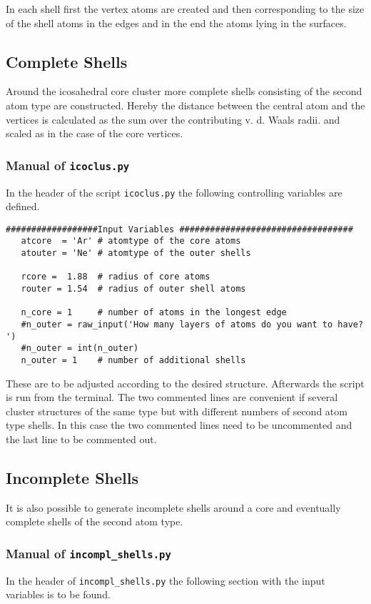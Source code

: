 In each shell first the vertex atoms are created and then corresponding
to the size of the shell atoms in the edges and in the end the atoms
lying in the surfaces.

\subsection{Complete Shells}
Around the icosahedral core cluster more complete shells consisting
of the second atom type are constructed. Hereby the distance between
the central atom and the vertices is calculated as the sum over the
contributing v. d. Waals radii. and scaled as in the case of the core
vertices.

\subsubsection{Manual of \lstinline|icoclus.py|}
In the header of the script \lstinline|icoclus.py| the following
controlling variables are defined.

\begin{lstlisting}
##################Input Variables ##################################
   atcore  = 'Ar' # atomtype of the core atoms
   atouter = 'Ne' # atomtype of the outer shells
   
   rcore =  1.88  # radius of core atoms
   router = 1.54  # radius of outer shell atoms
   
   n_core = 1     # number of atoms in the longest edge
   #n_outer = raw_input('How many layers of atoms do you want to have? ')
   #n_outer = int(n_outer)
   n_outer = 1    # number of additional shells
\end{lstlisting}

These are to be adjusted according to the desired structure.
Afterwards the script is run from the terminal.
The two commented lines are convenient if several cluster structures
of the same type but with different numbers of second atom type shells.
In this case the two commented lines need to be uncommented and the last
line to be commented out.

\subsection{Incomplete Shells}
It is also possible to generate incomplete shells around a core and
eventually complete shells of the second atom type.

\subsubsection{Manual of \lstinline|incompl_shells.py|}
In the header of \lstinline|incompl_shells.py| the following section
with the
input variables is to be found.

